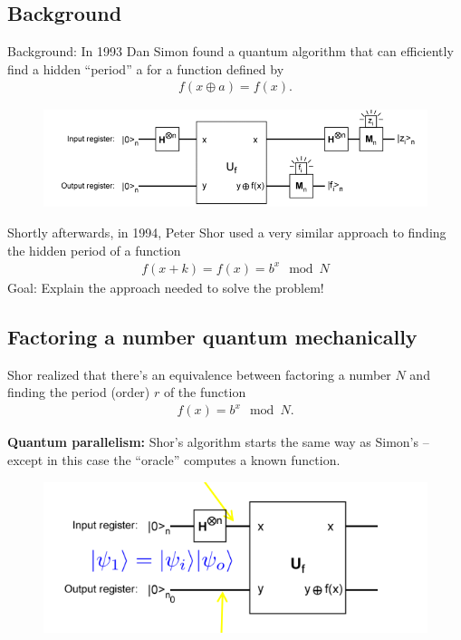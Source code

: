 \documentclass{book}
\theoremstyle{definition}
\begin{document}
\subsection{Background}

Background: In 1993 Dan Simon found a quantum
algorithm that can efficiently find a hidden ``period'' a for a
function defined by
\begin{align}
f(x \oplus a) = f(x).
\end{align}
\begin{figure}[!htb]
	\centering
	\includegraphics[scale=0.5]{rsa1}
\end{figure}


Shortly afterwards, in 1994, Peter Shor used a very similar
approach to finding the hidden period of a function 
\begin{align}
f(x+k) = f(x) = b^x \mod N
\end{align}
Goal: Explain the approach needed to solve the problem!


\subsection{Factoring a number quantum mechanically}

Shor realized that there's an equivalence between factoring a number $N$ and finding the period (order) $r$ of the function
\begin{align}
f(x) = b^x \mod N.
\end{align}

\noindent \textbf{Quantum parallelism:} Shor's algorithm starts the same way as Simon's – except in this case the ``oracle'' computes a known function.
\begin{figure}[!htb]
	\centering
	\includegraphics[scale=0.5]{shor1}
\end{figure}
\end{document}
